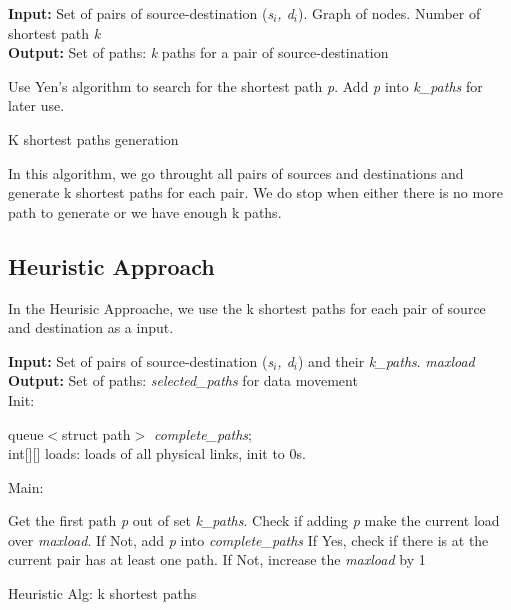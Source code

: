\begin{algorithm}[!htbp]
\textbf{Input:} Set of pairs of source-destination (\textit{s$_i$, d$_i$}). Graph of nodes. Number of shortest path \textit{k}\\
\textbf{Output:} Set of paths: \textit{k} paths for a pair of source-destination\\
\begin{algorithmic}
	\State Use Yen's algorithm to search for the shortest path \textit{p}.
        \State Add \textit{p} into \textit{k\_paths} for later use.
    \EndWhile
\EndFor
\end{algorithmic}

\caption{K shortest paths generation}
\label{alg:h1}

\end{algorithm}

In this algorithm, we go throught all pairs of sources and destinations and generate k shortest paths for each pair. We do stop when either there is no more path to generate or we have enough k paths.

\subsection{Heuristic Approach}

In the Heurisic Approache, we use the k shortest paths for each pair of source and destination as a input. 

\begin{algorithm}[!htbp]
\textbf{Input:} Set of pairs of source-destination (\textit{s$_i$, d$_i$}) and their \textit{k\_paths}. \textit{maxload}\\
\textbf{Output:} Set of paths: \textit{selected\_paths} for data movement\\
Init:
    \begin{algorithmic}
        \State queue$<$struct path$>$ \textit{complete\_paths};\\
	int[][] loads: loads of all physical links, init to 0s.\\
    \end{algorithmic}
Main:
\begin{algorithmic}
	    \State Get the first path \textit{p} out of set \textit{k\_paths}.
	    \State Check if adding \textit{p} make the current load over \textit{maxload}.
	    \State If Not, add \textit{p} into \textit{complete\_paths}
	    \State If Yes, check if there is at the current pair has at least one path.
	    \State If Not, increase the \textit{maxload} by 1
	\EndFor
    \EndFunction
\end{algorithmic}

\caption{Heuristic Alg: k shortest paths}
\label{alg:h2}

\end{algorithm}

